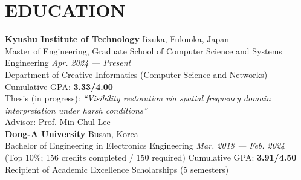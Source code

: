 \documentclass[a4paper,9pt]{extarticle}
\begin{document}
\section*{EDUCATION}
\textbf{Kyushu Institute of Technology} \hfill Iizuka, Fukuoka, Japan\\
Master of Engineering, Graduate School of Computer Science and Systems Engineering \hfill \textit{Apr. 2024 — Present} \\
Department of Creative Informatics (Computer Science and Networks)  \hfill Cumulative GPA: \textbf{3.33/4.00} \\
Thesis (in progress): \textit{“Visibility restoration via spatial frequency domain interpretation under harsh conditions”} \\
Advisor: \href{https://scholar.google.com/citations?user=9sv1-5QAAAAJ&hl=en&oi=ao}{Prof. Min-Chul Lee} \\

\noindent
\textbf{Dong-A University} \hfill Busan, Korea \\
Bachelor of Engineering in Electronics Engineering \hfill \textit{Mar. 2018 — Feb. 2024} \\
(Top 10\%; 156 credits completed / 150 required) \hfill Cumulative GPA: \textbf{3.91/4.50} \\
Recipient of Academic Excellence Scholarships (5 semesters) \\



\end{document}
